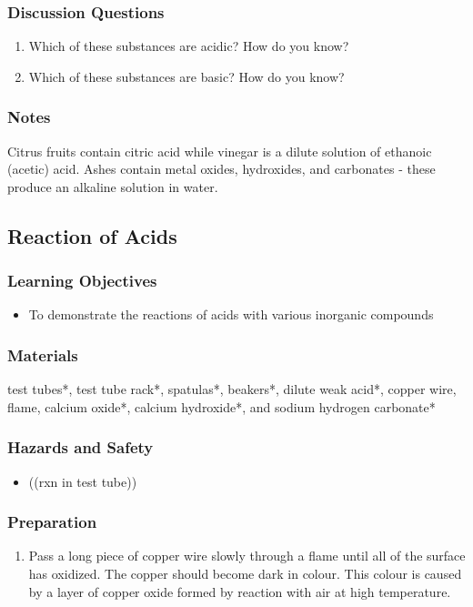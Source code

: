 \subsubsection*{Discussion Questions}
\begin{enumerate}
\item{Which of these substances are acidic? How do you know?}
\item{Which of these substances are basic? How do you know?}
\end{enumerate}

\subsubsection*{Notes}
Citrus fruits contain citric acid while vinegar is a dilute solution of ethanoic (acetic) acid. Ashes contain metal oxides, hydroxides, and carbonates - these produce an alkaline solution in water.

\subsection{Reaction of Acids}

\subsubsection*{Learning Objectives}
\begin{itemize}
\item{To demonstrate the reactions of acids with various inorganic compounds}
\end{itemize}

\subsubsection*{Materials}
test tubes*, test tube rack*, spatulas*, beakers*, dilute weak acid*, copper wire, flame, calcium oxide*, calcium hydroxide*, and sodium hydrogen carbonate*

\subsubsection*{Hazards and Safety}
\begin{itemize}
\item{((rxn in test tube))}
\end{itemize}

\subsubsection*{Preparation}
\begin{enumerate}
\item{Pass a long piece of copper wire slowly through a flame until all of the surface has oxidized. The copper should become dark in colour. This colour is caused by a layer of copper oxide formed by reaction with air at high temperature.}
\end{enumerate}

